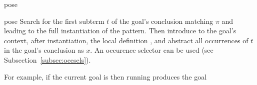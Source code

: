 \begin{tactic}[pose $\;x\!$ := $\;\pi$]{pose}
  \begin{tsyntax}[empty]{pose}
    Search for the first subterm $t$ of the goal's conclusion matching
    $\pi$ and leading to the full instantiation of the pattern. Then
    introduce to the goal's context, after instantiation, the local
    definition , and abstract all occurrences of $t$
    in the goal's conclusion as $x$. An occurence selector can be used
    (see Subsection~\ref{subsec:occsels}).

  For example, if the current goal is
   then
  running 
  produces the goal
  \end{tsyntax}
\end{tactic}
